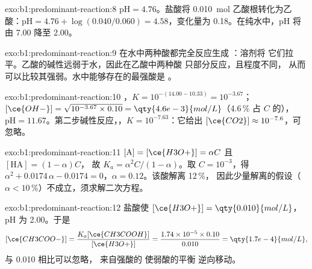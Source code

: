 \begin{solution}{exo:b1:predominant-reaction:8}
$\mathrm{pH} = 4.76$。盐酸将 \qty{0.010}{mol}
乙酸根转化为乙酸：$\mathrm{pH} = 4.76 + \log(0.040/0.060) = 4.58$，变化量为
0.18。在纯水中，pH 将由 7.00 降至 2.00。
\end{solution}

\begin{solution}{exo:b1:predominant-reaction:9}
在水中两种酸都完全反应生成 ：溶剂将
它们拉平。乙酸的碱性远弱于水，因此在乙酸中两种酸
只部分反应，且程度不同，
从而可以比较其强弱。水中能够存在的最强酸是 。
\end{solution}

\begin{solution}{exo:b1:predominant-reaction:10}
，$K = 10^{-(14.00 - 10.33)} = 10^{-3.67}$；
$[\ce{OH-}] = \sqrt{10^{-3.67} \times 0.10} = \qty{4.6e-3}{mol/L}$（4.6\,\%
占 $C$ 的），$\mathrm{pH} = 11.67$。第二步碱性反应，，$K = 10^{-7.63}$：它给出 $[\ce{CO2}] \approx
10^{-7.6}$，可忽略。
\end{solution}

\begin{solution}{exo:b1:predominant-reaction:11}
$[\mathrm{A}] = [\ce{H3O+}] = \alpha C$ 且 $[\mathrm{HA}] = (1 - \alpha)C$，
故 $K_a = \alpha^2C/(1 - \alpha)$。取 $C = 10^{-3}$，得 $\alpha^2 +
0.0174\,\alpha - 0.0174 = 0$，$\alpha = 0.12$。该酸解离 12\,\%，
因此少量解离的假设（$\alpha <
10\,\%$）不成立，须求解二次方程。
\end{solution}

\begin{solution}{exo:b1:predominant-reaction:12}
盐酸使 $[\ce{H3O+}] = \qty{0.010}{mol/L}$，pH 为 2.00。于是
\[
  [\ce{CH3COO-}] = \frac{K_a[\ce{CH3COOH}]}{[\ce{H3O+}]} = \frac{1.74 \times 10^{-5}
  \times 0.10}{0.010} = \qty{1.7e-4}{mol/L},
\]
与 0.010 相比可以忽略，
来自强酸的  使弱酸的平衡
逆向移动。
\end{solution}

